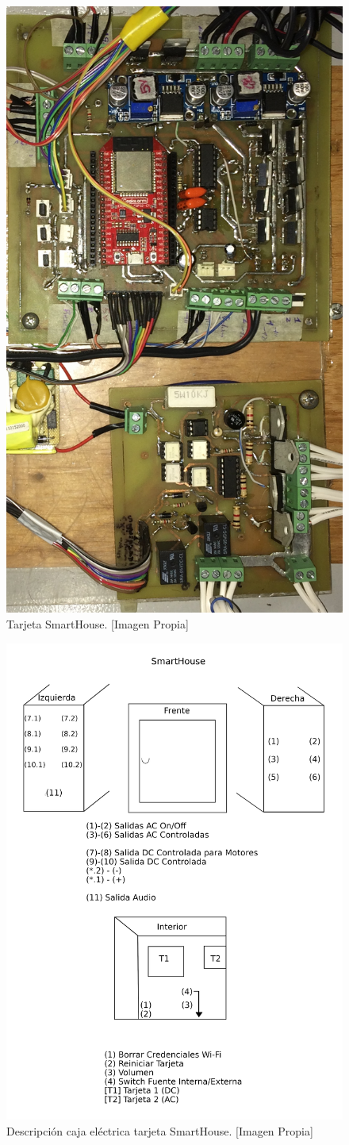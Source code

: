 \begin{figure}[!t]
	\centering
	\caption[Tarjeta SmartHouse.]{Tarjeta SmartHouse. [Imagen Propia]}
	\label{fig:tarjeta}
	\includegraphics[width=0.6\linewidth]{Imagenes/Tarjeta.jpg}
\end{figure}

\begin{figure}
	\centering
	\caption[Descripción caja eléctrica tarjeta SmartHouse.]{Descripción caja eléctrica tarjeta SmartHouse. [Imagen Propia]}
	\label{fig:labels}
	\includegraphics[width=0.7\linewidth]{Imagenes/labels}
\end{figure}

